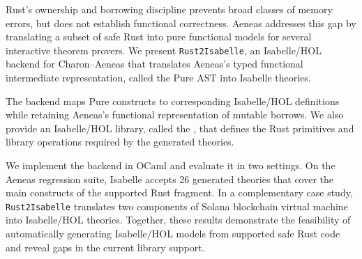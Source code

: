 Rust's ownership and borrowing discipline prevents broad classes of memory errors, but does not establish functional correctness.
Aeneas addresses this gap by translating a subset of safe Rust into pure functional models for several interactive theorem provers.
We present \texttt{Rust2Isabelle}, an Isabelle/HOL backend for Charon--Aeneas that translates Aeneas's typed functional intermediate representation, called the Pure AST into Isabelle theories.

The backend maps Pure constructs to corresponding Isabelle/HOL definitions while retaining Aeneas's functional representation of mutable borrows.
We also provide an Isabelle/HOL library, called the \rprelude{}, that defines the Rust primitives and library operations required by the generated theories.

We implement the backend in OCaml and evaluate it in two settings.
On the Aeneas regression suite, Isabelle accepts 26 generated theories that cover the main constructs of the supported Rust fragment.
In a complementary case study, \texttt{Rust2Isabelle} translates two components of Solana blockchain virtual machine into Isabelle/HOL theories.
Together, these results demonstrate the feasibility of automatically generating Isabelle/HOL models from supported safe Rust code and reveal gaps in the current library support.
